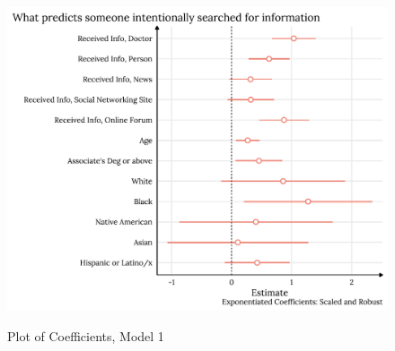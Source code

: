 

\begin{figure}
{\centering \includegraphics[width=0.8\linewidth]{figs/paper2/plot-model-1-1}}
\caption{Plot of Coefficients, Model 1}\label{fig:plot-model-1}
\end{figure}

